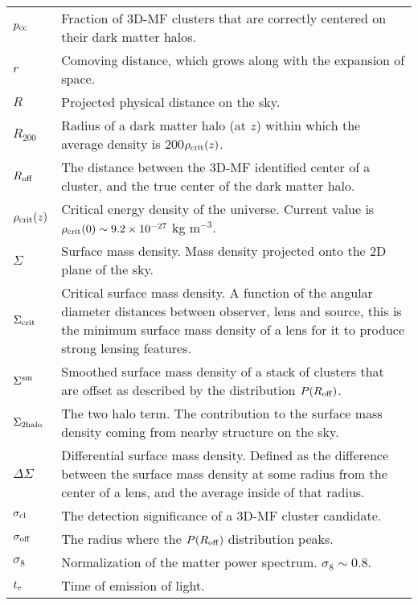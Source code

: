 \section*{\underline{}}
\vspace{-0.5cm}
\begin{tabular}{p{0.6in}p{5.8in}}


$p_{\rm cc}$ & Fraction of \acs{3D-MF} clusters that are correctly centered on their dark matter halos. \\
$r$ & Comoving distance, which grows along with the expansion of space. \\
$R$ & Projected physical distance on the sky. \\
$R_{200}$ & Radius of a dark matter halo (at $z$) within which the average density is 200$\rho_{\rm crit}(z)$. \\
$R_{\rm off}$ & The distance between the \acs{3D-MF} identified center of a cluster, and the true center of the dark matter halo. \\
$\rho_{\rm crit}(z)$ & Critical energy density of the universe. Current value is $\rho_{\rm crit}(0) \sim 9.2 \times 10^{-27}$ kg m$^{-3}$. \\
$\Sigma$ & Surface mass density. Mass density projected onto the 2D plane of the sky. \\
$\Sigma_{\rm crit}$ & Critical surface mass density. A function of the angular diameter distances between observer, lens and source, this is the minimum surface mass density of a lens for it to produce strong lensing features. \\
$\Sigma^{\rm sm}$ & Smoothed surface mass density of a stack of clusters that are offset as described by the distribution $P(R_{\rm off})$. \\
$\Sigma_{\rm 2halo}$ & The two halo term. The contribution to the surface mass density coming from nearby structure on the sky. \\
$\Delta\Sigma$ & Differential surface mass density. Defined as the difference between the surface mass density at some radius from the center of a lens, and the average inside of that radius. \\
$\sigma_{\rm cl}$ & The detection significance of a \acs{3D-MF} cluster candidate. \\
$\sigma_{\rm off}$ & The radius where the $P(R_{\rm off})$ distribution peaks. \\
$\sigma_8$ & Normalization of the matter power spectrum.  $\sigma_8 \sim 0.8$. \\
$t_{\rm e}$ & Time of emission of light. \\

\end{tabular}
